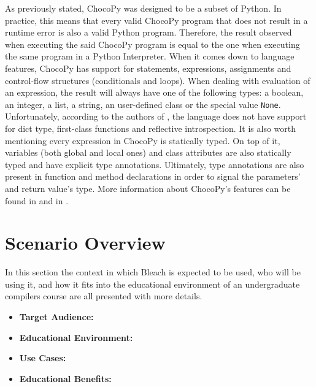 \begin{itemize}
    As previously stated, ChocoPy was designed to be a subset of Python. In practice, this means that every valid ChocoPy program that does not result in a runtime error is also a valid Python program. Therefore, the result observed when executing the said ChocoPy program is equal to the one when executing the same program in a Python Interpreter. When it comes down to language features, ChocoPy has support for statements, expressions, assignments and control-flow structures (conditionals and loops). When dealing with evaluation of an expression, the result will always have one of the following types: a boolean, an integer, a list, a string, an user-defined class or the special value \texttt{None}. Unfortunately, according to the authors of \cite{padhye2019chocopy}, the language does not have support for dict type, first-class functions and reflective introspection. It is also worth mentioning every expression in ChocoPy is statically typed. On top of it, variables (both global and local ones) and class attributes are also statically typed and have explicit type annotations. Ultimately, type annotations are also present in function and method declarations in order to signal the parameters' and return value's type. More information about ChocoPy's features can be found in \cite{padhye2019chocopy} and in \cite{chocopy_v2.2_language_manual_reference}.
    
\end{itemize}

\section{Scenario Overview}
In this section the context in which Bleach is expected to be used, who will be using it, and how it fits into the educational environment of an undergraduate compilers course are all presented with more details.

\begin{itemize}
    \item \textbf{Target Audience:}
    \item \textbf{Educational Environment:}
    \item \textbf{Use Cases:}
    \item \textbf{Educational Benefits:}
\end{itemize}